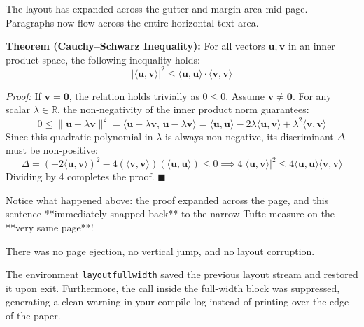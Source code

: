 \documentclass[paper=a4, fontsize=9]{habshe-tufte}
\begin{document}
\begin{layoutfullwidth}
  The layout has expanded across the gutter and margin area mid-page. Paragraphs now flow across the entire horizontal text area.
  

  \textbf{Theorem (Cauchy--Schwarz Inequality):} For all vectors $\mathbf{u}, \mathbf{v}$ in an inner product space, the following inequality holds:
  $$
  |\langle \mathbf{u}, \mathbf{v} \rangle|^2 \le \langle \mathbf{u}, \mathbf{u} \rangle \cdot \langle \mathbf{v}, \mathbf{v} \rangle
  $$
  
  \textit{Proof:} If $\mathbf{v} = \mathbf{0}$, the relation holds trivially as $0 \le 0$. Assume $\mathbf{v} \neq \mathbf{0}$. For any scalar $\lambda \in \mathbb{R}$, the non-negativity of the inner product norm guarantees:
  $$
  0 \le \|\mathbf{u} - \lambda \mathbf{v}\|^2 = \langle \mathbf{u} - \lambda \mathbf{v}, \, \mathbf{u} - \lambda \mathbf{v} \rangle = \langle \mathbf{u}, \mathbf{u} \rangle - 2\lambda \langle \mathbf{u}, \mathbf{v} \rangle + \lambda^2 \langle \mathbf{v}, \mathbf{v} \rangle
  $$
  Since this quadratic polynomial in $\lambda$ is always non-negative, its discriminant $\Delta$ must be non-positive:
  $$
  \Delta = (-2\langle \mathbf{u}, \mathbf{v} \rangle)^2 - 4(\langle \mathbf{v}, \mathbf{v} \rangle)(\langle \mathbf{u}, \mathbf{u} \rangle) \le 0 \implies 4|\langle \mathbf{u}, \mathbf{v} \rangle|^2 \le 4\langle \mathbf{u}, \mathbf{u} \rangle \langle \mathbf{v}, \mathbf{v} \rangle
  $$
  Dividing by 4 completes the proof. $\blacksquare$
\end{layoutfullwidth}


Notice what happened above: the proof expanded across the page, and this sentence **immediately snapped back** to the narrow Tufte measure on the **very same page**! 

There was no page ejection, no vertical jump, and no layout corruption. 

\begin{subtopic}
  The environment \texttt{layoutfullwidth} saved the previous layout stream and restored it upon exit. Furthermore, the \texttt{\string\marginpar} call inside the full-width block was suppressed, generating a clean warning in your compile log instead of printing over the edge of the paper.
\end{subtopic}
\end{document}
